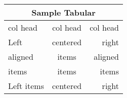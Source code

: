 \documentclass{book}
\begin{document}
\begin{tabular}{|l|c|r|}\hline
\multicolumn{3}{|c|}{Sample Tabular}\\\hline
col head & col head & col head\\
\hline Left & centered & right \\\cline{1-2}
aligned & items & aligned \\\cline{2-3}
items & items & items \\\cline{1-2}
Left items & centered & right \\\hline
\end{tabular}
\end{document}
